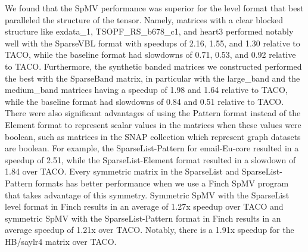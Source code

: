 We found that the SpMV performance was superior for the level format that best paralleled the structure of the tensor.
Namely, matrices with a clear blocked structure like exdata\_1, TSOPF\_RS\_b678\_c1, and heart3 performed notably well with the SparseVBL format with speedups of 2.16, 1.55, and 1.30 relative to TACO, while the baseline format had slowdowns of 0.71, 0.53, and 0.92 relative to TACO. Furthermore, the synthetic banded matrices we constructed performed the best with the SparseBand matrix, in particular with the large\_band and the medium\_band matrices having a speedup of 1.98 and 1.64 relative to TACO, while the baseline format had slowdowns of 0.84 and 0.51 relative to TACO.
There were also significant advantages of using the Pattern format instead of the Element format to represent scalar values in the matrices when these values were boolean, such as matrices in the SNAP collection which represent graph datasets are boolean. For example, the SparseList-Pattern for email-Eu-core resulted in a speedup of 2.51, while the SparseList-Element format resulted in a slowdown of 1.84 over TACO.
Every symmetric matrix in the SparseList and SparseList-Pattern formats has better performance when we use a Finch SpMV program that takes advantage of this symmetry.
Symmetric SpMV with the SparseList level format in Finch results in an average of 1.27x speedup over TACO and symmetric SpMV with the SparseList-Pattern format in Finch results in an average speedup of 1.21x over TACO.
Notably, there is a 1.91x speedup for the HB/saylr4 matrix over TACO. 






